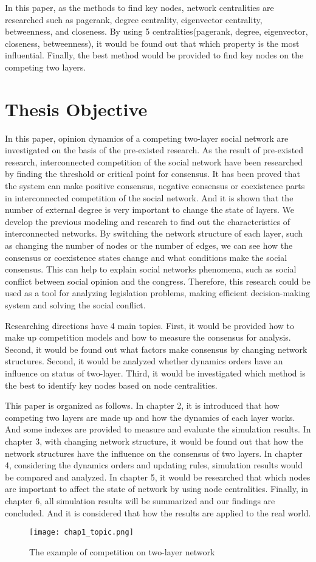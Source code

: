 In this paper, as the methods to find key nodes, network centralities are researched such as pagerank, degree centrality, eigenvector centrality, betweenness, and closeness.\cite{francisco2019, bianconi2018} By using 5 centralities(pagerank, degree, eigenvector, closeness, betweenness), it would be found out that which property is the most influential. Finally, the best method would be provided to find key nodes on the competing two layers. 

\section{Thesis Objective}
In this paper, opinion dynamics of a competing two-layer social network are investigated on the basis of the pre-existed research\cite{alvarez2016, gomez2015, diep2017, rocca2014}. As the result of pre-existed research, interconnected competition of the social network have been researched by finding the threshold or critical point for consensus\cite{alvarez2016, gomez2015, diep2017}. It has been proved that the system can make positive consensus, negative consensus or coexistence parts in interconnected competition of the social network\cite{alvarez2016}. And it is shown that the number of external degree is very important to change the state of layers\cite{gomez2015}. We develop the previous modeling and research to find out the characteristics of interconnected networks. By switching the network structure of each layer, such as changing the number of nodes or the number of edges, we can see how the consensus or coexistence states change and what conditions make the social consensus. This can help to explain social networks phenomena, such as social conflict between social opinion and the congress. Therefore, this research could be used as a tool for analyzing legislation problems, making efficient decision-making system and solving the social conflict. 

Researching directions have 4 main topics. First, it would be provided how to make up competition models and how to measure the consensus for analysis. Second, it would be found out what factors make consensus by changing network structures. Second, it would be analyzed whether dynamics orders have an influence on status of two-layer. Third, it would be investigated which method is the best to identify key nodes based on node centralities.

This paper is organized as follows. In chapter 2, it is introduced that how competing two layers are made up and how the dynamics of each layer works. And some indexes are provided to measure and evaluate the simulation results. In chapter 3, with changing network structure, it would be found out that how the network structures have the influence on the consensus of two layers. In chapter 4, considering the dynamics orders and updating rules, simulation results would be compared and analyzed. In chapter 5, it would be researched that which nodes are important to affect the state of network by using node centralities. Finally, in chapter 6, all simulation results will be summarized and our findings are concluded. And it is considered that how the results are applied to the real world. 

\begin{figure}[!htb]
	\centering
	\texttt{[image: chap1\_topic.png]}
	\caption{The example of competition on two-layer network}
	\label{chap1_topic}
\end{figure}
